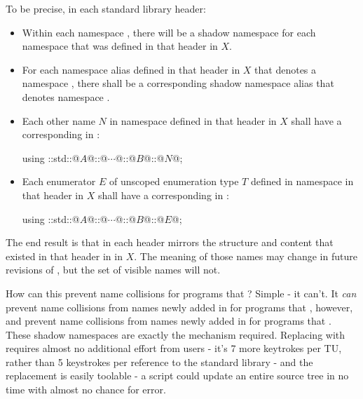 To be precise, in each standard library header:
\begin{itemize}
\item Within each namespace , there will be a shadow
  namespace  for each namespace
   that was defined in that header in \Cpp$X$.

\item For each namespace alias  defined in that
  header in \Cpp$X$ that denotes a namespace
  , there shall be
  a corresponding shadow namespace alias
   that denotes namespace
  .

\item Each other name $N$ in namespace 
  defined in that header in \Cpp$X$ shall have a corresponding
   in :
  \begin{codeblock}
  using ::std::@$A$@::@$\cdots$@::@$B$@::@$N$@;
  \end{codeblock}

\item Each enumerator $E$ of unscoped enumeration type $T$ defined in namespace
   in that header in \Cpp$X$ shall have
  a corresponding 
  in :
  \begin{codeblock}
  using ::std::@$A$@::@$\cdots$@::@$B$@::@$E$@;
  \end{codeblock}
\end{itemize}
The end result is that  in each header mirrors
the structure and content that existed in that header in  in \Cpp$X$.
The meaning of those names may change in future revisions of \Cpp, but the set
of visible names will not.

How can this prevent name collisions for programs that
? Simple - it can't. It \emph{can} prevent name
collisions from names newly added in  for programs that
, however, and prevent name collisions
from names newly added in  for programs that
. These shadow namespaces are exactly the
mechanism required. Replacing  with
 requires almost no additional effort from
users - it's 7 more keytrokes per TU, rather than 5 keystrokes per reference to
the standard library - and the replacement is easily toolable - a 
script could update an entire source tree in no time with almost no chance for
error.

